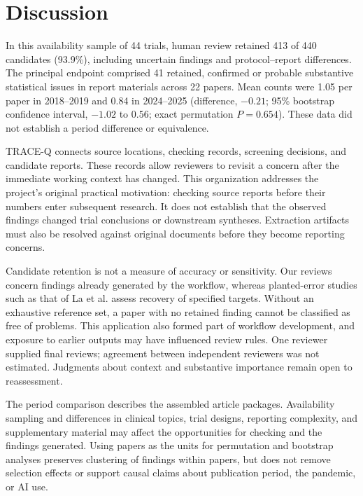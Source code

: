 \documentclass[12pt,a4paper]{article}
\begin{document}




\section{Discussion}
In this availability sample of 44 trials, human review retained 413 of 440 candidates (93.9\%), including uncertain findings and protocol--report differences. The principal endpoint comprised 41 retained, confirmed or probable substantive statistical issues in report materials across 22 papers. Mean counts were 1.05 per paper in 2018--2019 and 0.84 in 2024--2025 (difference, $-0.21$; 95\% bootstrap confidence interval, $-1.02$ to $0.56$; exact permutation $P=0.654$). These data did not establish a period difference or equivalence.

TRACE-Q connects source locations, checking records, screening decisions, and candidate reports. These records allow reviewers to revisit a concern after the immediate working context has changed. This organization addresses the project's original practical motivation: checking source reports before their numbers enter subsequent research. It does not establish that the observed findings changed trial conclusions or downstream syntheses. Extraction artifacts must also be resolved against original documents before they become reporting concerns.

Candidate retention is not a measure of accuracy or sensitivity. Our reviews concern findings already generated by the workflow, whereas planted-error studies such as that of La et al. assess recovery of specified targets.\cite{la2026consistency} Without an exhaustive reference set, a paper with no retained finding cannot be classified as free of problems. This application also formed part of workflow development, and exposure to earlier outputs may have influenced review rules. One reviewer supplied final reviews; agreement between independent reviewers was not estimated. Judgments about context and substantive importance remain open to reassessment.

The period comparison describes the assembled article packages. Availability sampling and differences in clinical topics, trial designs, reporting complexity, and supplementary material may affect the opportunities for checking and the findings generated. Using papers as the units for permutation and bootstrap analyses preserves clustering of findings within papers, but does not remove selection effects or support causal claims about publication period, the pandemic, or AI use.
\end{document}

